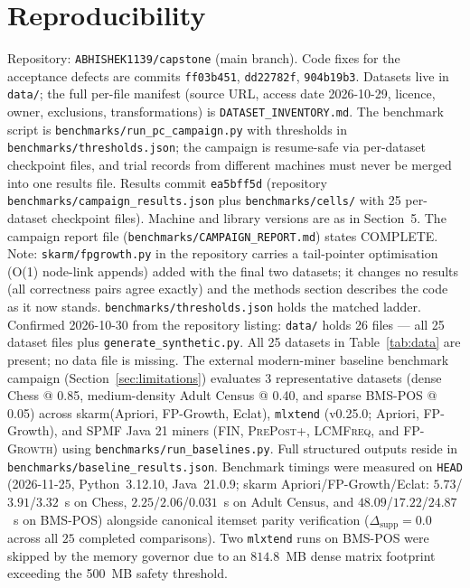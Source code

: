\documentclass[twocolumn,10pt]{article}
\newcommand{\skarm}{\textsf{skarm}\xspace}
\begin{document}
\section{Reproducibility}
\label{app:repro}
Repository: \texttt{ABHISHEK1139/capstone} (main branch). Code fixes
for the acceptance defects are commits \texttt{ff03b451},
\texttt{dd22782f}, \texttt{904b19b3}. Datasets live in
\texttt{data/}; the full per-file manifest (source URL, access date
2026-10-29, licence, owner, exclusions, transformations) is
\texttt{DATASET\_INVENTORY.md}. The benchmark script is
\texttt{benchmarks/run\_pc\_campaign.py} with thresholds in
\texttt{benchmarks/\allowbreak{}thresholds.json}; the campaign is resume-safe via
per-dataset checkpoint files, and trial records from different machines
must never be merged into one results file.
Results commit \texttt{ea5bff5d} (repository \texttt{benchmarks/campaign\_results.json} plus \texttt{benchmarks/cells/} with 25 per-dataset checkpoint files). Machine and library versions are as in Section~5. The campaign report file (\texttt{benchmarks/CAMPAIGN\_REPORT.md}) states COMPLETE. Note: \texttt{skarm/fpgrowth.py} in the repository carries a tail-pointer optimisation (O(1) node-link appends) added with the final two datasets; it changes no results (all correctness pairs agree exactly) and the methods section describes the code as it now stands. \texttt{benchmarks/\allowbreak{}thresholds.json} holds the matched ladder.
Confirmed 2026-10-30 from the repository listing: \texttt{{data/}} holds 26 files --- all 25 dataset files plus \texttt{{generate\_synthetic.py}}. All 25 datasets in Table~\ref{tab:data} are present; no data file is missing.
The external modern-miner baseline benchmark campaign (Section~\ref{sec:limitations}) evaluates 3 representative datasets (dense Chess @ 0.85, medium-density Adult Census @ 0.40, and sparse BMS-POS @ 0.05) across \skarm (Apriori, FP-Growth, Eclat), \texttt{mlxtend} (v0.25.0; Apriori, FP-Growth), and SPMF Java 21 miners (\textsc{FIN}, \textsc{PrePost+}, \textsc{LCMFreq}, and \textsc{FP-Growth}) using \texttt{benchmarks/run\_baselines.py}. Full structured outputs reside in \texttt{benchmarks/baseline\_results.json}. Benchmark timings were measured on \texttt{HEAD} (2026-11-25, Python~3.12.10, Java~21.0.9; \skarm Apriori/FP-Growth/Eclat: $5.73$/$3.91$/$3.32$~s on Chess, $2.25$/$2.06$/$0.031$~s on Adult Census, and $48.09$/$17.22$/$24.87$~s on BMS-POS) alongside canonical itemset parity verification ($\Delta_{\mathrm{supp}} = 0.0$ across all $25$ completed comparisons). Two \texttt{mlxtend} runs on BMS-POS were skipped by the memory governor due to an $814.8$~MB dense matrix footprint exceeding the 500~MB safety threshold.
\end{document}
